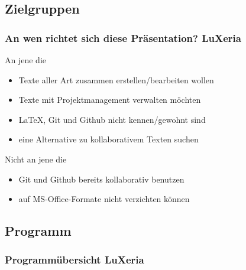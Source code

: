 \subsection{Zielgruppen}
\begin{frame}
    \frametitle{An wen richtet sich diese Präsentation? \hfill{} \footnotesize{LuXeria}}
    \begin{exampleblock}{An jene die}
        \begin{itemize}
            \item Texte aller Art zusammen erstellen/bearbeiten wollen
            \item Texte mit Projektmanagement verwalten möchten
            \item \LaTeX, Git und Github nicht kennen/gewohnt sind
            \item eine Alternative zu kollaborativem Texten suchen
        \end{itemize}
    \end{exampleblock}

    \begin{alertblock}{Nicht an jene die}
        \begin{itemize}
            \item Git und Github bereits kollaborativ benutzen
            \item auf MS-Office-Formate nicht verzichten können
        \end{itemize}
    \end{alertblock}
\end{frame}

\subsection{Programm}
\begin{frame}
\frametitle{Programmübersicht \hfill{} \footnotesize{LuXeria}}
    \tableofcontents[hideallsubsections]
\end{frame}
